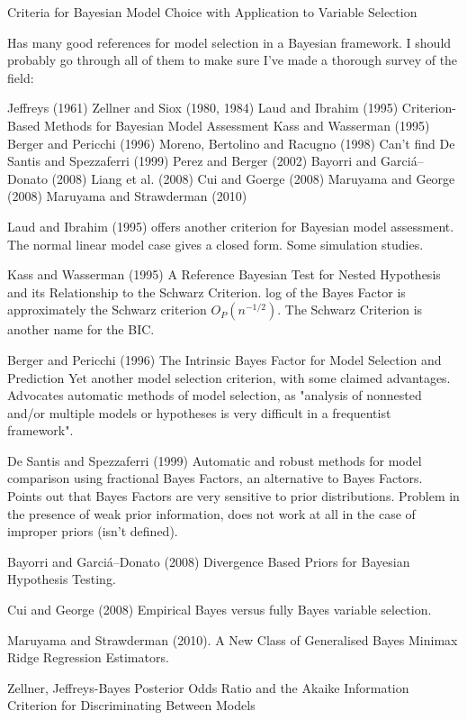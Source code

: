 \documentclass{amsart}[12pt]
\begin{document}
Criteria for Bayesian Model Choice with Application to Variable Selection

Has many good references for model selection in a Bayesian framework. I should probably go through all of them
to make sure I've made a thorough survey of the field:

Jeffreys (1961)
Zellner and Siox (1980, 1984)
Laud and Ibrahim (1995) Criterion-Based Methods for Bayesian Model Assessment
Kass and Wasserman (1995)
Berger and Pericchi (1996)
Moreno, Bertolino and Racugno (1998) Can't find
De Santis and Spezzaferri (1999)
Perez and Berger (2002)
Bayorri and Garci\'{a}--Donato (2008)
Liang et al. (2008)
Cui and Goerge (2008)
Maruyama and George (2008)
Maruyama and Strawderman (2010)

Laud and Ibrahim (1995) offers another criterion for Bayesian model assessment. The normal linear model case
gives a closed form. Some simulation studies.

Kass and Wasserman (1995) A Reference Bayesian Test for Nested Hypothesis and its Relationship to the
Schwarz Criterion. log of the Bayes Factor is approximately the Schwarz criterion $O_P(n^{-1/2})$. The
Schwarz Criterion is another name for the BIC.

Berger and Pericchi (1996) The Intrinsic Bayes Factor for Model Selection and Prediction
Yet another model selection criterion, with some claimed advantages. Advocates automatic methods of model 
selection, as "analysis of nonnested and/or multiple models or hypotheses is very difficult in a frequentist
framework".

De Santis and Spezzaferri (1999) Automatic and robust methods for model comparison using fractional Bayes
Factors, an alternative to Bayes Factors. Points out that Bayes Factors are very sensitive to prior
distributions. Problem in the presence of weak prior information, does not work at all in the case of improper
priors (isn't defined).

Bayorri and Garci\'{a}--Donato (2008) Divergence Based Priors for Bayesian Hypothesis Testing.

Cui and George (2008) Empirical Bayes versus fully Bayes variable selection.

Maruyama and Strawderman (2010). A New Class of Generalised Bayes Minimax Ridge Regression Estimators.

Zellner, Jeffreys-Bayes Posterior Odds Ratio and the Akaike Information Criterion for Discriminating Between
Models
\end{document}
